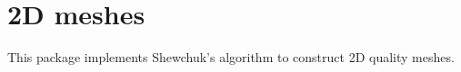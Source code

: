 \chapter{2D meshes}

\minitoc

This package implements Shewchuk's algorithm to construct 2D quality meshes.
